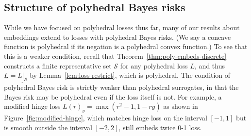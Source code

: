 \documentclass[11pt]{article}
\newcommand{\Comments}{1}
\newcommand{\mynote}[2]{\ifnum\Comments=1\textcolor{#1}{#2}\fi}
\newcommand{\raf}[1]{\mynote{darkgreen}{[RF: #1]}}
\newcommand{\jessie}[1]{\mynote{teal}{[JF: #1]}}
\newcommand{\Sc}{\mathcal{S}}
\newcommand{\risk}[1]{\underline{#1}}
\begin{document}

\subsection{Structure of polyhedral Bayes risks}

While we have focused on polyhedral losses thus far, many of our results about embeddings extend to losses with polyhedral Bayes risks.
(We say a concave function is polyhedral if its negation is a polyhedral convex function.)
To see that this is a weaker condition, recall that Theorem~\ref{thm:poly-embeds-discrete} constructs a finite representative set $\Sc$ for any polyhedral loss $L$, and thus $\risk{L} = \risk{L|_\Sc}$ by Lemma~\ref{lem:loss-restrict}, which is polyhedral.
The condition of polyhedral Bayes risk is strictly weaker than polyhedral surrogates, in that the Bayes risk may be polyhedral even if the loss itself is not.
For example, a modified hinge loss $L(r)_y = \max(r^2-1,1-ry)$ as shown in Figure~\ref{fig:modified-hinge}, which matches hinge loss on the interval $[-1,1]$ but is smooth outside the interval $[-2,2]$, still embeds twice 0-1 loss.
\end{document}

